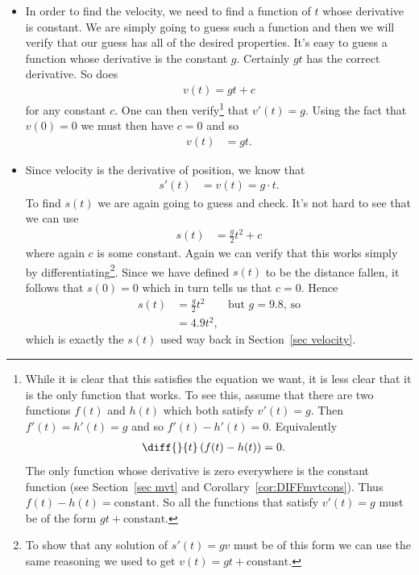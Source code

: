 \begin{eg}
\begin{itemize}
\item In order to find the velocity, we need to find a function of $t$ whose derivative
is constant. We are simply going to guess such a function and then we will verify that our
guess has all of the desired properties. It's easy to guess a function whose derivative is
the constant $g$.  Certainly $gt$ has the correct derivative. So does
\begin{align*}
    v(t) = gt + c
\end{align*}
for any constant $c$. One can then verify\footnote{While it is clear that this satisfies
the equation we want, it is less clear that it is the only function that
works. To see this, assume that there are two functions $f(t)$ and $h(t)$ which both
satisfy $v'(t)=g$. Then $f'(t)=h'(t) = g$ and so $f'(t)-h'(t) = 0$. Equivalently
\begin{align*}
  \diff{}{t}\left( f(t)-h(t) \right) &= 0.
\end{align*}
The only function whose derivative is zero everywhere is the constant function (see
Section~\ref{sec mvt} and Corollary~\ref{cor:DIFFmvtcons}). Thus $f(t)-h(t) =
\text{constant}$. So all the functions that satisfy $v'(t)=g$ must be of the form $gt +
\text{constant}$.
} that $v'(t)=g$. Using the fact that $v(0)=0$ we must then have $c=0$ and so
\begin{align*}
  v(t) &= gt.
\end{align*}

\item Since velocity is the derivative of position, we know that
\begin{align*}
  s'(t) &= v(t) = g \cdot t.
\end{align*}
To find $s(t)$ we are again going to guess and check. It's not hard to see that we can use
\begin{align*}
  s(t) &= \frac{g}{2} t^2 + c
\end{align*}
where again $c$ is some constant. Again we can verify that this works
simply by differentiating\footnote{To show that any solution of $s'(t)=gv$
must be of this form we can use the same reasoning we used to get $v(t) = gt +
\text{constant}$.}. Since we have defined $s(t)$ to be the distance fallen, it follows
that $s(0)=0$ which in turn tells us that $c = 0$. Hence
\begin{align*}
  s(t) &= \frac{g}{2} t^2 & \text{but $g=9.8$, so}\\
  &= 4.9 t^2,
\end{align*}
which is exactly the $s(t)$ used way back in Section~\ref{sec velocity}.
\end{itemize}


\end{eg}

